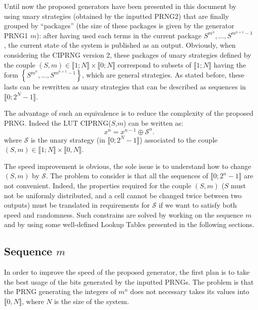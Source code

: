 Until now the proposed generators have been presented in this document by using unary 
strategies (obtained by the inputted PRNG2) that are finally grouped by ``packages'' 
(the size of these packages is given by the generator PRNG1 $m$): after having used each terms 
in the current package $S^{m^n},...,S^{m^{n+1}-1}$, the current state of the system is published as an output.
Obviously, when considering the CIPRNG version 2, these packages of unary strategies defined by the 
couple $(S,m)\in \llbracket 1;N \rrbracket \times \llbracket 0;N \rrbracket$ correspond to 
subsets of $\llbracket 1;N \rrbracket$ having the form $\left\{S^{m^n},...,S^{m^{n+1}-1}\right\}$, 
which are general strategies.
As stated before, these lasts can be rewritten as unary strategies that can 
be described as sequences in $\llbracket 0; 2^N-1 \rrbracket$.



The advantage of such an equivalence is to reduce the complexity of the proposed PRNG.
Indeed the LUT CIPRNG($S$,$m$) can be written as:
\begin{equation}
x^n = x^{n-1} \oplus \mathcal{S}^n.
\end{equation}
where $\mathcal{S}$ is the unary strategy (in $\llbracket 0; 2^N-1 \rrbracket$) associated 
to the couple $(S,m)\in \llbracket 1;N \rrbracket \times \llbracket 0,N \rrbracket$.

The speed improvement is obvious, the sole issue is to understand how to change $(S,m)$ by $\mathcal{S}$.
The problem to consider is that all the sequences of $\llbracket 0; 2^n-1 \rrbracket$ are not convenient.
Indeed, the properties required for the couple $(S,m)$ ($S$ must not be uniformly distributed, 
and a cell cannot be changed twice between two outputs) must be translated in requirements for 
$\mathcal{S}$ if we want to satisfy both speed and randomness.
Such constrains are solved by working on the sequence $m$ and by using some well-defined Lookup 
Tables presented in the following sections.

\subsection{Sequence $m$}
\label{LUT1}

In order to improve the speed of the proposed generator, 
the first plan is to take the best usage of the bits generated by the inputted PRNGs.
The problem is that the PRNG generating the integers of $m^n$ does not necessary takes its values 
into $\llbracket 0, N \rrbracket$, where $N$ is the size of the system.


